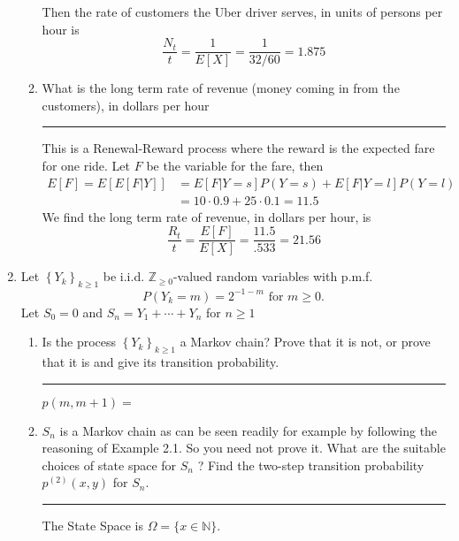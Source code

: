 \documentclass{article} %
\theoremstyle{plain}
\theoremstyle{case}
\begin{document}
\begin{enumerate}[label={\fbox{\textbf{Exercise \#\arabic* :}}}]
\begin{enumerate}
       Then the rate of customers the Uber driver serves, in units of persons per hour is
       \[ \frac{N_t}{t}  = \frac{1}{E[X]}  = \frac{1}{32/60} = 1.875 \]
     \item What is the long term rate of revenue (money coming in from the customers), in dollars per hour
\par\noindent\rule{\textwidth}{0.1pt}
        This is a Renewal-Reward process where the reward is the expected
        fare for one ride.  Let $F$ be the variable for the fare, then
       \begin{align*}
         E[F] = E[E[F|Y]] &= E[F|Y=s]P(Y=s) + E[F|Y=l]P(Y=l)   \\
                          &= 10 \cdot 0.9 + 25 \cdot 0.1 = 11.5
       \end{align*}
        We find the long term rate of revenue, in dollars per hour, is
        \[ \frac{R_t}{t} = \frac{E[F]}{E[X]} = \frac{11.5}{.533} = 21.56 \]
    \end{enumerate}

  \newpage
  \item Let $\left\{Y_k\right\}_{k \geq 1}$ be i.i.d. $\mathbb{Z}_{\geq 0}$-valued random variables with p.m.f.
    \[
      P\left(Y_k=m\right)=2^{-1-m} \text { for } m \geq 0 .
      \]
    Let $S_0=0$ and $S_n=Y_1+\cdots+Y_n$ for $n \geq 1$
    \begin{enumerate}
      \item Is the process $\left\{Y_k\right\}_{k \geq 1}$ a Markov chain? Prove that it is not, or prove that it is and give its transition probability.
\par\noindent\rule{\textwidth}{0.1pt}
      $p(m, m+1) = $
      \item  $S_n$ is a Markov chain as can be seen readily for example by following the reasoning of Example 2.1. So you need not prove it. What are the suitable choices of state space for $S_n$ ? Find the two-step transition probability $p^{(2)}(x, y)$ for $S_n$.
\par\noindent\rule{\textwidth}{0.1pt}
        The State Space is $\Omega = \{ x \in \mathbb{N} \}$.


\end{enumerate}
\end{enumerate}
\end{document}
